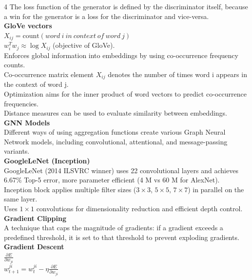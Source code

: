 \documentclass[8pt]{extarticle}
\begin{document}
\begin{multicols}{4}
The loss function of the generator is defined by the discriminator itself, because a win for the generator is a loss for the discriminator and vice-versa.\\
\vspace{2pt}\textbf{GloVe vectors}\\
$X_{ij} = \text{count}(word\ i\ in\ context\ of\ word\ j)$\\
$w_i^{T} w_j \approx \log X_{ij}$ (objective of GloVe).\\
Enforces global information into embeddings by using co-occurrence frequency counts.\\
Co-occurrence matrix element $X_{ij}$ denotes the number of times word i appears in the context of word j.\\
Optimization aims for the inner product of word vectors to predict co-occurrence frequencies.\\
Distance measures can be used to evaluate similarity between embeddings.\\
\vspace{2pt}\textbf{GNN Models}\\
Different ways of using aggregation functions create various Graph Neural Network models, including convolutional, attentional, and message-passing variants.\\
\vspace{2pt}\textbf{GoogleLeNet (Inception)}\\
GoogleLeNet (2014 ILSVRC winner) uses 22 convolutional layers and achieves 6.67\% Top-5 error, more parameter efficient (4 M vs 60 M for AlexNet).\\
Inception block applies multiple filter sizes ($3\times3$, $5\times5$, $7\times7$) in parallel on the same layer.\\
Uses $1\times1$ convolutions for dimensionality reduction and efficient depth control.\\
\vspace{2pt}\textbf{Gradient Clipping}\\
A technique that caps the magnitude of gradients: if a gradient exceeds a predefined threshold, it is set to that threshold to prevent exploding gradients.\\
\vspace{2pt}\textbf{Gradient Descent}\\
$\frac{\partial E}{\partial w_{ji}}$\\
$w_{t+1}^{ji} = w_{t}^{ji} - \eta \frac{\partial E}{\partial w_{ji}}$\\


\end{multicols}
\end{document}
